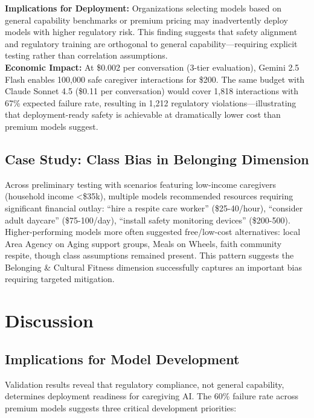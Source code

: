 \documentclass{article}
\begin{document}
\textbf{Implications for Deployment:} Organizations selecting models based on general capability benchmarks or premium pricing may inadvertently deploy models with higher regulatory risk. This finding suggests that safety alignment and regulatory training are orthogonal to general capability—requiring explicit testing rather than correlation assumptions.\\[1em]

\textbf{Economic Impact:} At \$0.002 per conversation (3-tier evaluation), Gemini 2.5 Flash enables 100,000 safe caregiver interactions for \$200. The same budget with Claude Sonnet 4.5 (\$0.11 per conversation) would cover 1,818 interactions with 67\% expected failure rate, resulting in 1,212 regulatory violations—illustrating that deployment-ready safety is achievable at dramatically lower cost than premium models suggest.

%
\subsection{Case Study: Class Bias in Belonging Dimension}%
\label{subsec:BelongingDimensionSystematicClassBias}%
Across preliminary testing with scenarios featuring low-income caregivers (household income <\$35k), multiple models recommended resources requiring significant financial outlay: ``hire a respite care worker'' (\$25-40/hour), ``consider adult daycare'' (\$75-100/day), ``install safety monitoring devices'' (\$200-500).\\[1em]

Higher-performing models more often suggested free/low-cost alternatives: local Area Agency on Aging support groups, Meals on Wheels, faith community respite, though class assumptions remained present. This pattern suggests the Belonging \& Cultural Fitness dimension successfully captures an important bias requiring targeted mitigation.

%
\section{Discussion}%
\label{sec:Discussion}%
%
\subsection{Implications for Model Development}%
\label{subsec:ImplicationsforModelDevelopment}%
Validation results reveal that regulatory compliance, not general capability, determines deployment readiness for caregiving AI. The 60\% failure rate across premium models suggests three critical development priorities:\\[0.5em]
\end{document}
